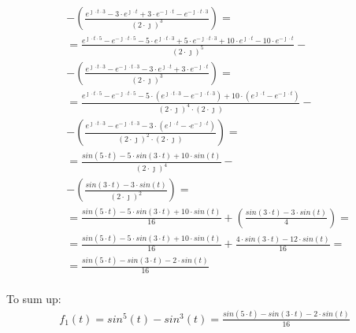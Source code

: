 \begin{task}
\begin{align*}
&-\left(\frac{e^{\jmath \cdot t \cdot 3} - 3 \cdot e^{\jmath \cdot t} + 3 \cdot e^{-\jmath \cdot t} - e^{-\jmath \cdot t \cdot 3}}{\left(2 \cdot \jmath\right)^3}\right)=\\
&=\frac{e^{\jmath \cdot t \cdot 5} - e^{-\jmath \cdot t \cdot 5} - 5 \cdot e^{\jmath \cdot t \cdot 3} + 5 \cdot e^{-\jmath \cdot t \cdot 3} + 10 \cdot e^{\jmath \cdot t} - 10 \cdot e^{-\jmath \cdot t}}{\left(2 \cdot \jmath\right)^5} - \\
&-\left(\frac{e^{\jmath \cdot t \cdot 3} - e^{-\jmath \cdot t \cdot 3} - 3 \cdot e^{\jmath \cdot t} + 3 \cdot e^{-\jmath \cdot t}}{\left(2 \cdot \jmath\right)^3}\right)=\\
&=\frac{e^{\jmath \cdot t \cdot 5} - e^{-\jmath \cdot t \cdot 5} - 5 \cdot (e^{\jmath \cdot t \cdot 3} - e^{-\jmath \cdot t \cdot 3}) + 10 \cdot (e^{\jmath \cdot t} - e^{-\jmath \cdot t})}{\left(2 \cdot \jmath\right)^4 \cdot (2 \cdot \jmath)} - \\
&-\left(\frac{e^{\jmath \cdot t \cdot 3} - e^{-\jmath \cdot t \cdot 3} - 3 \cdot (e^{\jmath \cdot t} - \cdot e^{-\jmath \cdot t})}{\left(2 \cdot \jmath\right)^2 \cdot (2 \cdot \jmath)}\right)=\\
&=\frac{sin(5 \cdot t) - 5 \cdot sin(3 \cdot t) + 10 \cdot sin(t)}{\left(2 \cdot \jmath\right)^4} - \\
&-\left(\frac{sin(3 \cdot t) - 3 \cdot sin(t)}{\left(2 \cdot \jmath\right)^2}\right)=\\
&=\frac{sin(5 \cdot t) - 5 \cdot sin(3 \cdot t) + 10 \cdot sin(t)}{16} +\left(\frac{sin(3 \cdot t) - 3 \cdot sin(t)}{4}\right)=\\
&=\frac{sin(5 \cdot t) - 5 \cdot sin(3 \cdot t) + 10 \cdot sin(t)}{16} +\frac{4 \cdot sin(3 \cdot t) - 12 \cdot sin(t)}{16}=\\
&=\frac{sin(5 \cdot t) - sin(3 \cdot t) -2 \cdot sin(t)}{16}\\
\end{align*}

To sum up:
\begin{align*}
f_{1}(t)=sin^5(t)-sin^3(t) = \frac{sin(5 \cdot t) - sin(3 \cdot t) -2 \cdot sin(t)}{16}
\end{align*}



\end{task}
